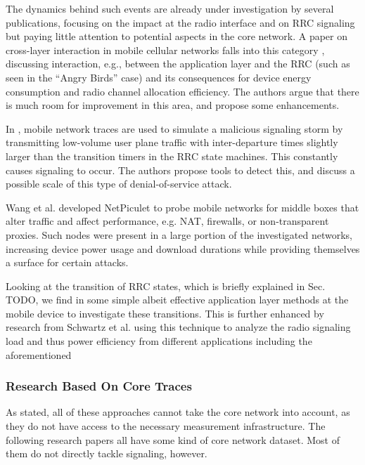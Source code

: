 The dynamics behind such events are already under investigation by several publications, focusing on the impact at the radio interface and on \gls{RRC} signaling but paying little attention to potential aspects in the core network. A paper on cross-layer interaction in mobile cellular networks falls into this category \cite{qian2011profiling}, discussing interaction, e.g., between the application layer and the \gls{RRC} (such as seen in the ``Angry Birds'' case) and its consequences for device energy consumption and radio channel allocation efficiency. The authors argue that there is much room for improvement in this area, and propose some enhancements.


In \cite{lee2007detection}, mobile network traces are used to simulate a malicious signaling storm by transmitting low-volume user plane traffic with inter-departure times slightly larger than the transition timers in the \gls{RRC} state machines. This constantly causes signaling to occur. The authors propose tools to detect this, and discuss a possible scale of this type of denial-of-service attack.

 
Wang et al.\cite{sigcomm11middleboxes} developed NetPiculet to probe mobile networks for middle boxes that alter traffic and affect performance, e.g. NAT, firewalls, or non-transparent proxies. Such nodes were present in a large portion of the investigated networks, increasing device power usage and download durations while providing themselves a surface for certain attacks.

Looking at the transition of \gls{RRC} states, which is briefly explained in Sec. TODO, we find in \cite{5360763} some simple albeit effective application layer methods at the mobile device to investigate these transitions. This is further enhanced by research from Schwartz et al.\cite{schwartz2013angrybirds} using this technique to analyze the radio signaling load and thus power efficiency from different applications including the aforementioned


\subsubsection{Research Based On Core Traces}

As stated, all of these approaches cannot take the core network into account, as they do not have access to the necessary measurement infrastructure. The following research papers all have some kind of core network dataset. Most of them do not directly tackle signaling, however.

